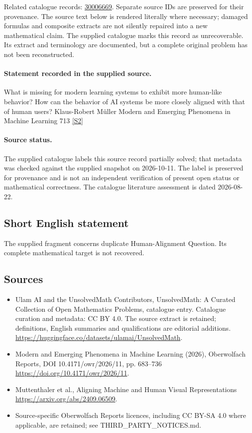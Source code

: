 \documentclass[11pt]{article}
\begin{document}
Related catalogue records: \href{https://mehmetmars7.github.io/Erdosproblems-llm-hunter/problem.html?type=open_problems&id=30006669}{30006669}. Separate source IDs are preserved for their provenance.
The source text below is rendered literally where necessary; damaged formulas and composite extracts are not silently repaired into a new mathematical claim.
The supplied catalogue marks this record as unrecoverable. Its extract and terminology are documented, but a complete original problem has not been reconstructed.
\paragraph{Statement recorded in the supplied source.}
What is missing for modern learning systems to exhibit more human-like behavior? How can the behavior of AI systems be more closely aligned with that of human users? Klaus-Robert Müller Modern and Emerging Phenomena in Machine Learning 713 \href{https://doi.org/10.4171/owr/2026/11}{[S2]}
\paragraph{Source status.}
The supplied catalogue labels this source record partially solved; that metadata was checked against the supplied snapshot on 2026-10-11. The label is preserved for provenance and is not an independent verification of present open status or mathematical correctness. The catalogue literature assessment is dated 2026-08-22.
\subsection{Short English statement}
The supplied fragment concerns duplicate Human-Alignment Question. Its complete mathematical target is not recovered.
\subsection{Sources}
\begin{itemize}
\item[S1] Ulam AI and the UnsolvedMath Contributors, UnsolvedMath: A Curated Collection of Open Mathematics Problems, catalogue entry. Catalogue curation and metadata: CC BY 4.0. The source extract is retained; definitions, English summaries and qualifications are editorial additions.
\url{https://huggingface.co/datasets/ulamai/UnsolvedMath}.
\item[S2] Modern and Emerging Phenomena in Machine Learning (2026), Oberwolfach Reports, DOI 10.4171/owr/2026/11, pp. 683--736
\url{https://doi.org/10.4171/owr/2026/11}.
\item[S3] Muttenthaler et al., Aligning Machine and Human Visual Representations
\url{https://arxiv.org/abs/2409.06509}.
\item Source-specific Oberwolfach Reports licences, including CC BY-SA 4.0 where applicable, are retained; see THIRD\_PARTY\_NOTICES.md.
\end{itemize}
\end{document}
